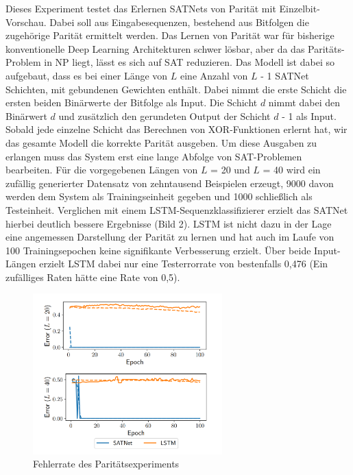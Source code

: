 Dieses Experiment testet das Erlernen SATNets von Parität mit Einzelbit-Vorschau. Dabei soll aus Eingabesequenzen, bestehend aus Bitfolgen die zugehörige Parität ermittelt werden. Das Lernen von Parität war für bisherige konventionelle Deep Learning Architekturen schwer lösbar, aber da das Paritäts-Problem in NP liegt, lässt es sich auf SAT reduzieren. Das Modell ist dabei so aufgebaut, dass es bei einer Länge von $L$ eine Anzahl von $L$ - 1 SATNet Schichten, mit gebundenen Gewichten enthält. Dabei nimmt die erste Schicht die ersten beiden Binärwerte der Bitfolge als Input. Die Schicht $d$ nimmt dabei den Binärwert $d$ und zusätzlich den gerundeten Output der Schicht $d$ - 1 als Input. Sobald jede einzelne Schicht das Berechnen von XOR-Funktionen erlernt hat, wir das gesamte Modell die korrekte Parität ausgeben. Um diese Ausgaben zu erlangen muss das System erst eine lange Abfolge von SAT-Problemen bearbeiten. Für die vorgegebenen Längen von $L$ = 20 und $L$ = 40 wird ein zufällig generierter Datensatz von zehntausend Beispielen erzeugt, 9000 davon werden dem System als Trainingseinheit gegeben und 1000 schließlich als Testeinheit. Verglichen mit einem LSTM-Sequenzklassifizierer erzielt das SATNet hierbei deutlich bessere Ergebnisse (Bild 2). LSTM ist nicht dazu in der Lage eine angemessen Darstellung der Parität zu lernen und hat auch im Laufe von 100 Trainingsepochen keine signifikante Verbesserung erzielt. Über beide Input-Längen erzielt LSTM dabei nur eine Testerrorrate von bestenfalls 0,476 (Ein zufälliges Raten hätte eine Rate von 0,5). \cite[p.~6]{https://doi.org/10.48550/arxiv.1905.12149}

\begin{figure}[h]
 \centering
 \includegraphics[width=0.65\textwidth]{images/SATNet_LSTM_graph.png}
 \caption{Fehlerrate des Paritätsexperiments \cite[p.~6]{https://doi.org/10.48550/arxiv.1905.12149}}
 \label{fig:parity}
\end{figure}




